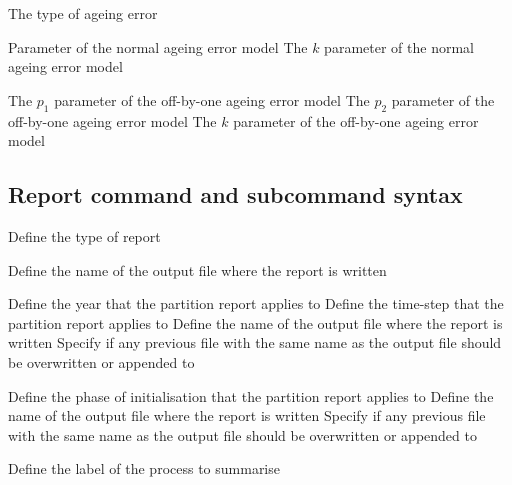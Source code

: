  {The type of ageing error}
\par\textbf{}\par
\par\textbf{}\par
{} {Parameter of the normal ageing error model}
 {The $k$ parameter of the normal ageing error model}
\par\textbf{}\par
{} {The $p_1$ parameter of the off-by-one ageing error model}
 {The $p_2$ parameter of the off-by-one ageing error model}
 {The $k$ parameter of the off-by-one ageing error model}
\subsection{Report command and subcommand syntax}\par
{}\par\par
{} {Define the type of report}
\par\textbf{}\par
{} {Define the name of the output file where the report is written}
\par\textbf{}\par
{} {Define the year that the partition report applies to}
 {Define the time-step that the partition report applies to}
 {Define the name of the output file where the report is written}
 {Specify if any previous file with the same name as the output file should be overwritten or appended to}
\par\textbf{}\par
{} {Define the phase of initialisation that the partition report applies to}
 {Define the name of the output file where the report is written}
 {Specify if any previous file with the same name as the output file should be overwritten or appended to}
\par\textbf{}\par
{} {Define the label of the process to summarise}
